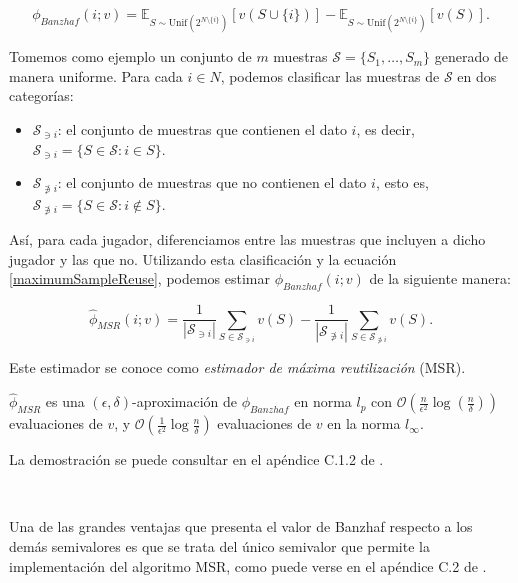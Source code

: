 \begin{equation}
  \label{maximumSampleReuse}
  \phi_{Banzhaf}(i;v) = \mathbb{E}_{S \sim \text{Unif}(2^{N\setminus \{i\}})}
  [v(S \cup \{i\})] - 
  \mathbb{E}_{S \sim \text{Unif}(2^{N\setminus \{i\}})}
  [v(S)].
\end{equation}

Tomemos como ejemplo un conjunto de $m$ muestras
$\mathcal{S} = \{S_1,\dots,S_m\}$ generado de manera
uniforme. Para cada $i \in N$, podemos clasificar las
muestras de $\mathcal{S}$ en dos categorías:

\begin{itemize}
  \item $\mathcal{S}_{\ni i}$: el conjunto de muestras
  que contienen el dato $i$, es decir,
  $\mathcal{S}_{\ni i} = \{S \in \mathcal{S}: i \in S\}$.
  \item $\mathcal{S}_{\not \ni  i}$: el conjunto de muestras
  que no contienen el dato $i$, esto es,
  $\mathcal{S}_{\not \ni  i} = \{S \in \mathcal{S}: i \not
  \in S\}$.
\end{itemize}

Así, para cada jugador, diferenciamos entre las muestras
que incluyen a dicho jugador y las que no. Utilizando esta
clasificación y la ecuación \ref{maximumSampleReuse},
podemos estimar $\phi_{Banzhaf}(i;v)$ de la siguiente manera: 

\begin{equation*}
  \hat{\phi}_{MSR}(i;v) = \frac{1}{|\mathcal{S}_{\ni i}|}
  \sum_{S \in \mathcal{S}_{\ni i}} v(S) -
  \frac{1}{|\mathcal{S}_{\not \ni i}|}
  \sum_{S \in \mathcal{S}_{\not \ni i}} v(S).
\end{equation*}

Este estimador se conoce como \emph{estimador de máxima
reutilización} (MSR). 

\begin{theorem}
  $\hat{\phi}_{MSR}$ es una $(\epsilon,\delta)$-aproximación
  de $\phi_{Banzhaf}$ en norma $l_p$ con  $\mathcal{O}
  (\frac{n}{\epsilon^2} \log(\frac{n}{\delta}))$ evaluaciones
  de $v$, y $\mathcal{O}(\frac{1}{\epsilon^2}
  \log{\frac{n}{\delta}})$ evaluaciones de $v$ en la norma
  $l_{\infty}$.
\end{theorem}


La demostración se puede consultar en el 
apéndice C.1.2 de \cite{dataBanzhaf}.

\

Una de las grandes ventajas que presenta el valor
de Banzhaf respecto a los demás semivalores es que
se trata del único semivalor que permite la implementación
del algoritmo MSR, como puede verse en el apéndice
C.2 de \cite{dataBanzhaf}.

